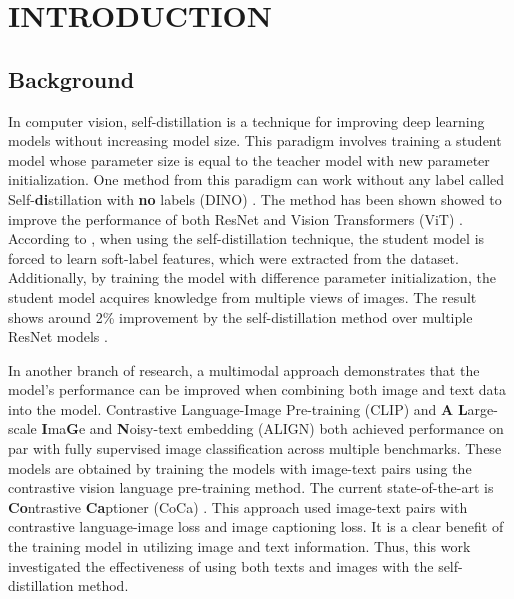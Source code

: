 \setlength{\parindent}{0in}
\setlength{\parskip}{1.5mm}
\setlength{\baselineskip}{1.6em}

\chapter{INTRODUCTION}
\section{Background}

In computer vision, self-distillation  is a technique for improving deep learning models without increasing model size.
This paradigm involves training a student model whose parameter size is equal to the teacher model with new parameter initialization.
One method from this paradigm can work without any label called Self-\textbf{di}stillation with \textbf{no} labels (DINO) .
The method has been shown showed to improve the performance of both ResNet  and Vision Transformers (ViT) .
According to , when using the self-distillation technique, the student model is forced to learn soft-label features, which were extracted from the dataset. Additionally, by training the model with difference parameter initialization, the student model acquires knowledge from multiple views of images. The result shows around 2\% improvement by the self-distillation method over multiple ResNet models .

In another branch of research, a multimodal approach demonstrates that the model's performance can be improved when combining both image and text data into the model.
Contrastive Language-Image Pre-training (CLIP)  and \textbf{A} \textbf{L}arge-scale \textbf{I}ma\textbf{G}e and \textbf{N}oisy-text embedding (ALIGN)  both achieved performance on par with fully supervised image classification across multiple benchmarks.
These models are obtained by training the models with image-text pairs using the contrastive vision language pre-training method.
The current state-of-the-art is \textbf{Co}ntrastive \textbf{Ca}ptioner (CoCa) .
This approach used image-text pairs with contrastive language-image loss and image captioning loss.
It is a clear benefit of the training model in utilizing image and text information.
Thus, this work investigated the effectiveness of using both texts and images with the self-distillation method.

